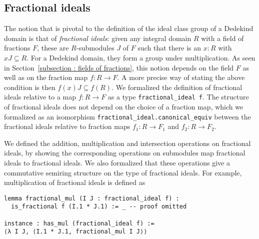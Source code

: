 \documentclass[a4paper,USenglish,cleveref, autoref, thm-restate]{lipics-v2021}
\newcommand{\lean}[1]{\texttt{#1}\xspace} %
\begin{document}
\subsection{Fractional ideals}\label{subsection:frac_ideals}
The notion that is pivotal to the definition of the ideal class group of a Dedekind domain is that of \emph{fractional ideals}: given any integral domain $R$ with a field of fractions $F$, these are 
$R$-submodules $J$ of $F$ such that there is an $x : R$ with $x J \subseteq R$. %
For a Dedekind domain, they form a group under multiplication. As seen in Section~\ref{subsection : fields of fractions}, this notion depends on the field $F$ as well as on the fraction map $f\colon R\to F$. A more precise way of stating the above condition is then 
$f(x)J\subseteq f(R)$. We formalized the definition of fractional ideals relative to a map $f\colon R\to F$ as a type \lean{fractional\_ideal f}. 
The structure of fractional ideals does not depend on the choice of a fraction map, which we formalized as an isomorphism \lean{fractional\_ideal.canonical\_equiv} between the fractional ideals relative to fraction maps $f_1\colon R\to F_1$ and $f_2\colon R\to F_2$.

We defined the addition, multiplication and intersection operations on fractional ideals,
by showing the corresponding operations on submodules map fractional ideals to fractional ideals.
We also formalized that these operations give a commutative semiring structure on the type of fractional ideals.
For example, multiplication of fractional ideals is defined as
\begin{lstlisting}
lemma fractional_mul (I J : fractional_ideal f) :
  is_fractional f (I.1 * J.1) := _ -- proof omitted

instance : has_mul (fractional_ideal f) :=
⟨λ I J, ⟨I.1 * J.1, fractional_mul I J⟩⟩
\end{lstlisting}
\end{document}
